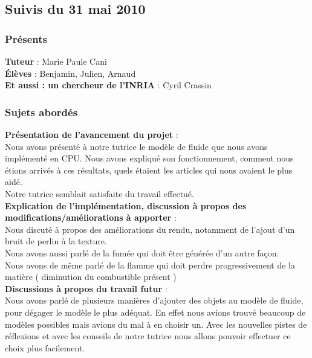 \documentclass[a4paper,10pt]{article}
\begin{document}
\subsection{Suivis du  31 mai 2010}
\subsubsection{Présents}
\textbf{Tuteur} : Marie Paule Cani\\
\textbf{Élèves} : Benjamin, Julien, Arnaud \\
\textbf{Et aussi : un chercheur de l'INRIA} : Cyril Crassin \\

\subsubsection{Sujets abordés}
\textbf{Présentation de l'avancement du projet} :  \\
    Nous avons présenté à notre tutrice le modèle de fluide que nous avons implémenté en CPU.
    Nous avons expliqué son fonctionnement, comment nous étions arrivés à ces résultats, 
    quels étaient les articles qui nous avaient le plus aidé.\\
    Notre tutrice semblait satisfaite du travail effectué.\\
    
\textbf{Explication de l'implémentation, discussion à propos des modifications/améliorations à apporter} :  \\
    Nous discuté à propos des améliorations du rendu, notamment de l'ajout d'un bruit de perlin à la texture.\\
    Nous avons aussi parlé de la fumée qui doit être générée d'un autre façon.\\
    Nous avons de même parlé de la flamme qui doit perdre progressivement de la matière ( diminution du combustible présent )\\
    
\textbf{Discussions à propos du travail futur} :  \\
    Nous avons parlé de plusieurs manières d'ajouter des objets au modèle de fluide, 
    pour dégager le modèle le plus adéquat. En effet nous avions trouvé beaucoup de modèles 
    possibles mais avions du mal à en choisir un. Avec les nouvelles pistes de 
    réflexions et avec les conseils de notre tutrice nous allons pouvoir effectuer
    ce choix plus facilement.\\
    
\end{document}
